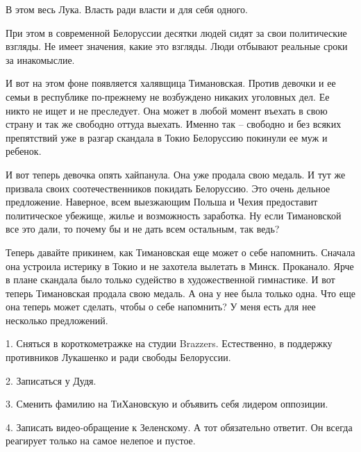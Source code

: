 В этом весь Лука. Власть ради власти и для себя одного.

При этом в современной Белоруссии десятки людей сидят за свои политические
взгляды. Не имеет значения, какие это взгляды. Люди отбывают реальные сроки за
инакомыслие.

И вот на этом фоне появляется халявщица Тимановская. Против девочки и ее семьи
в республике по-прежнему не возбуждено никаких уголовных дел. Ее никто не ищет
и не преследует. Она может в любой момент въехать в свою страну и так же
свободно оттуда выехать. Именно так – свободно и без всяких препятствий уже в
разгар скандала в Токио Белоруссию покинули ее муж и ребенок.

И вот теперь девочка опять хайпанула. Она уже продала свою медаль. И тут же
призвала своих соотечественников покидать Белоруссию. Это очень дельное
предложение. Наверное, всем выезжающим Польша и Чехия предоставит политическое
убежище, жилье и возможность заработка. Ну если Тимановской все это дали, то
почему бы и не дать всем остальным, так ведь?

Теперь давайте прикинем, как Тимановская еще может о себе напомнить. Сначала
она устроила истерику в Токио и не захотела вылетать в Минск. Проканало. Ярче в
плане скандала было только судейство в художественной гимнастике. И вот теперь
Тимановская продала свою медаль. А она у нее была только одна. Что еще она
теперь может сделать, чтобы о себе напомнить? У меня есть для нее несколько
предложений.

1. Сняться в короткометражке на студии Brazzers. Естественно, в поддержку
противников Лукашенко и ради свободы Белоруссии.

2. Записаться у Дудя.

3. Сменить фамилию на ТиХановскую и объявить себя лидером оппозиции.

4. Записать видео-обращение к Зеленскому. А тот обязательно ответит. Он всегда
реагирует только на самое нелепое и пустое.
